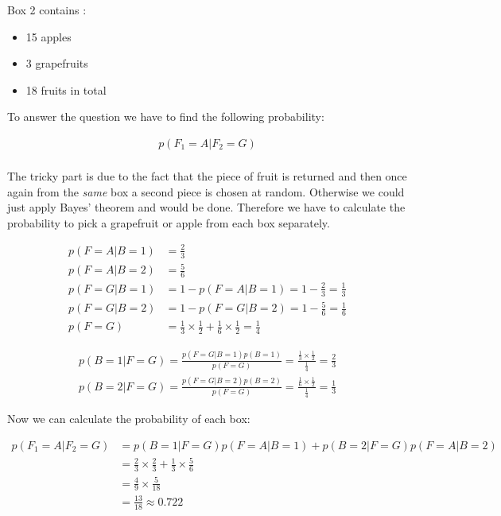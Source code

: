 \documentclass[a4paper]{article}
\begin{document}
Box 2 contains :

\begin{itemize}
	\item 15 apples
	\item 3 grapefruits
	\item 18 fruits in total
\end{itemize}

To answer the question we have to find the following probability:

\begin{align*}
	p(F_1 = A | F_2 = G)\\	
\end{align*}



The tricky part is due to the fact that the piece of fruit is returned and then once again from the \textit{same} box a second piece is chosen at random. Otherwise we could just apply Bayes' theorem and would be done. Therefore we have to calculate the probability to pick a grapefruit or apple from each box separately.

\begin{align*}
	p(F = A | B = 1) &= \frac{2}{3}\\
	p(F = A | B = 2) &= \frac{5}{6}\\
	p(F = G | B = 1) &= 1 - p(F = A | B = 1) = 1 - \frac{2}{3} = \frac{1}{3}\\
	p(F = G | B = 2) &= 1 - p(F = G | B = 2) = 1 - \frac{5}{6} = \frac{1}{6}\\
	p(F = G) &= \frac{1}{3} \times \frac{1}{2} + \frac{1}{6} \times \frac{1}{2} = \frac{1}{4}
\end{align*}

\begin{align*}
	p(B = 1 | F = G) = \frac{p(F = G | B = 1)p(B = 1)}{p(F = G)} = \frac{\frac{1}{3} \times \frac{1}{2}}{\frac{1}{4}} = \frac{2}{3}\\
	p(B = 2 | F = G) = \frac{p(F = G | B = 2)p(B = 2)}{p(F = G)} = \frac{\frac{1}{6} \times \frac{1}{2}}{\frac{1}{4}} = \frac{1}{3}
\end{align*}

Now we can calculate the probability of each box:

\begin{align*}
	p(F_1 = A | F_2 = G) &= p(B = 1| F = G)p(F = A | B = 1) + p(B = 2 | F = G)p(F = A | B = 2)\\
	&= \frac{2}{3} \times \frac{2}{3} +  \frac{1}{3} \times \frac{5}{6}	\\
	&= \frac{4}{9} \times \frac{5}{18}\\
	&= \frac{13}{18} \approx 0.722
\end{align*}
\end{document}
